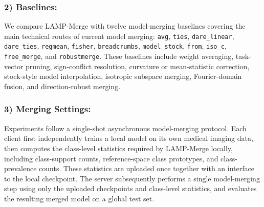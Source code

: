 \documentclass[letterpaper]{article} %
\begin{document}
\subsubsection{2) Baselines:}

We compare LAMP-Merge with twelve model-merging baselines covering the main technical routes of current model merging: \texttt{avg}\cite{pmlr-v162-wortsman22a}, \texttt{ties}\cite{yadav2023tiesmergingresolvinginterferencemerging}, \texttt{dare\_linear}\cite{yu2024languagemodelssupermario}, \texttt{dare\_ties}\cite{yu2024languagemodelssupermario}, \texttt{regmean}\cite{jin2025datalessknowledgefusionmerging}, \texttt{fisher}\cite{matena2022mergingmodelsfisherweightedaveraging}, \texttt{breadcrumbs}\cite{davari2024modelbreadcrumbsscalingmultitask}, \texttt{model\_stock}\cite{jang2025modelstockneedjust}, \texttt{from}\cite{ilharco2023editingmodelstaskarithmetic}, \texttt{iso\_c}\cite{marczak2025taskleftbehindisotropic}, \texttt{free\_merge}\cite{zheng2025freemergingfouriertransformefficient}, and \texttt{robustmerge}\cite{zeng2025robustmergeparameterefficientmodelmerging}. These baselines include weight averaging, task-vector pruning, sign-conflict resolution, curvature or mean-statistic correction, stock-style model interpolation, isotropic subspace merging, Fourier-domain fusion, and direction-robust merging.

\subsubsection{3) Merging Settings:}

Experiments follow a single-shot asynchronous model-merging protocol. Each client first independently trains a local model on its own medical imaging data, then computes the class-level statistics required by LAMP-Merge locally, including class-support counts, reference-space class prototypes, and class-prevalence counts. These statistics are uploaded once together with an interface to the local checkpoint. The server subsequently performs a single model-merging step using only the uploaded checkpoints and class-level statistics, and evaluates the resulting merged model on a global test set.
\end{document}
